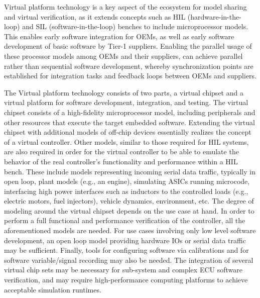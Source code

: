 Virtual platform technology is a key aspect of the ecosystem for model sharing and virtual verification,
as it extends concepts such as HIL (hardware-in-the-loop) and SIL (software-in-the-loop) benches to include microprocessor models.
This enables early software integration for OEMs,
as well as early software development of basic software by Tier-1 suppliers.
Enabling the parallel usage of these processor models among OEMs and their suppliers,
can achieve parallel rather than sequential software development,
whereby synchronization points are established for integration tasks and feedback loops between OEMs and suppliers.

The Virtual platform technology consists of two parts, a virtual chipset and a virtual platform for software development, integration, and testing.
The virtual chipset consists of a high-fidelity microprocessor model,
including peripherals and other resources that execute the target embedded software.
Extending the virtual chipset with additional models of off-chip devices essentially realizes the concept of a virtual controller.
Other models, similar to those required for HIL systems, are also required in order for the virtual controller to be able to emulate the behavior of the real controller's functionality and performance within a HIL bench.
These include models representing incoming serial data traffic, typically in open loop,
plant models (e.g., an engine), simulating ASICs running microcode, interfacing high power interfaces such as inductors to the controlled loads (e.g., electric motors, fuel injectors),
vehicle dynamics, environment, etc.
The degree of modeling around the virtual chipset depends on the use case at hand.
In order to perform a full functional and performance verification of the controller, all the aforementioned models are needed.
For use cases involving only low level software development, an open loop model providing hardware IOs or serial data traffic may be sufficient.
Finally, tools for configuring software via calibrations and for software variable/signal recording may also be needed.
The integration of several virtual chip sets may be necessary for sub-system and complex ECU software verification, and may require high-performance computing platforms to achieve acceptable simulation runtimes.